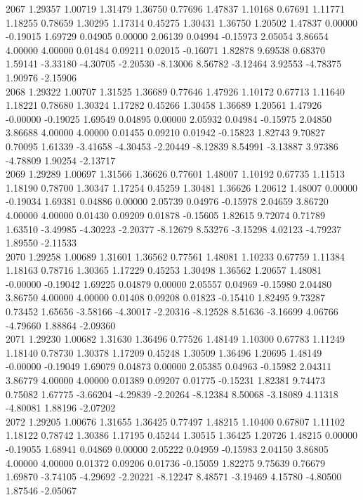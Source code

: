 {2067 1.29357 1.00719 1.31479 1.36750 0.77696 1.47837 1.10168 0.67691 1.11771 1.18255 0.78659 1.30295 1.17314 0.45275 1.30431 1.36750 1.20502 1.47837 0.00000 -0.19015 1.69729 0.04905 0.00000 2.06139 0.04994 -0.15973 2.05054 3.86654 4.00000 4.00000 0.01484 0.09211 0.02015 -0.16071 1.82878 9.69538 0.68370 1.59141 -3.33180 -4.30705 -2.20530 -8.13006 8.56782 -3.12464 3.92553 -4.78375 1.90976 -2.15906 \\
2068 1.29322 1.00707 1.31525 1.36689 0.77646 1.47926 1.10172 0.67713 1.11640 1.18221 0.78680 1.30324 1.17282 0.45266 1.30458 1.36689 1.20561 1.47926 -0.00000 -0.19025 1.69549 0.04895 0.00000 2.05932 0.04984 -0.15975 2.04850 3.86688 4.00000 4.00000 0.01455 0.09210 0.01942 -0.15823 1.82743 9.70827 0.70095 1.61339 -3.41658 -4.30453 -2.20449 -8.12839 8.54991 -3.13887 3.97386 -4.78809 1.90254 -2.13717 \\
2069 1.29289 1.00697 1.31566 1.36626 0.77601 1.48007 1.10192 0.67735 1.11513 1.18190 0.78700 1.30347 1.17254 0.45259 1.30481 1.36626 1.20612 1.48007 0.00000 -0.19034 1.69381 0.04886 0.00000 2.05739 0.04976 -0.15978 2.04659 3.86720 4.00000 4.00000 0.01430 0.09209 0.01878 -0.15605 1.82615 9.72074 0.71789 1.63510 -3.49985 -4.30223 -2.20377 -8.12679 8.53276 -3.15298 4.02123 -4.79237 1.89550 -2.11533 \\
2070 1.29258 1.00689 1.31601 1.36562 0.77561 1.48081 1.10233 0.67759 1.11384 1.18163 0.78716 1.30365 1.17229 0.45253 1.30498 1.36562 1.20657 1.48081 -0.00000 -0.19042 1.69225 0.04879 0.00000 2.05557 0.04969 -0.15980 2.04480 3.86750 4.00000 4.00000 0.01408 0.09208 0.01823 -0.15410 1.82495 9.73287 0.73452 1.65656 -3.58166 -4.30017 -2.20316 -8.12528 8.51636 -3.16699 4.06766 -4.79660 1.88864 -2.09360 \\
2071 1.29230 1.00682 1.31630 1.36496 0.77526 1.48149 1.10300 0.67783 1.11249 1.18140 0.78730 1.30378 1.17209 0.45248 1.30509 1.36496 1.20695 1.48149 -0.00000 -0.19049 1.69079 0.04873 0.00000 2.05385 0.04963 -0.15982 2.04311 3.86779 4.00000 4.00000 0.01389 0.09207 0.01775 -0.15231 1.82381 9.74473 0.75082 1.67775 -3.66204 -4.29839 -2.20264 -8.12384 8.50068 -3.18089 4.11318 -4.80081 1.88196 -2.07202 \\
2072 1.29205 1.00676 1.31655 1.36425 0.77497 1.48215 1.10400 0.67807 1.11102 1.18122 0.78742 1.30386 1.17195 0.45244 1.30515 1.36425 1.20726 1.48215 0.00000 -0.19055 1.68941 0.04869 0.00000 2.05222 0.04959 -0.15983 2.04150 3.86805 4.00000 4.00000 0.01372 0.09206 0.01736 -0.15059 1.82275 9.75639 0.76679 1.69870 -3.74105 -4.29692 -2.20221 -8.12247 8.48571 -3.19469 4.15780 -4.80500 1.87546 -2.05067 \\
}
